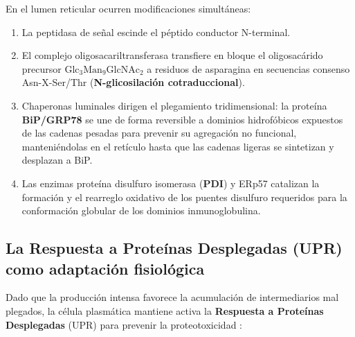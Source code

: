 En el lumen reticular ocurren modificaciones simultáneas:
\begin{enumerate}
	\item La peptidasa de señal escinde el péptido conductor N-terminal.
	\item El complejo oligosacariltransferasa transfiere en bloque el oligosacárido precursor $\text{Glc}_3\text{Man}_9\text{GlcNAc}_2$ a residuos de asparagina en secuencias consenso Asn-X-Ser/Thr (\textbf{N-glicosilación cotraduccional}).
	\item Chaperonas luminales dirigen el plegamiento tridimensional: la proteína \textbf{BiP/GRP78} se une de forma reversible a dominios hidrofóbicos expuestos de las cadenas pesadas para prevenir su agregación no funcional, manteniéndolas en el retículo hasta que las cadenas ligeras se sintetizan y desplazan a BiP.
	\item Las enzimas proteína disulfuro isomerasa (\textbf{PDI}) y ERp57 catalizan la formación y el rearreglo oxidativo de los puentes disulfuro requeridos para la conformación globular de los dominios inmunoglobulina.
\end{enumerate}

\subsection{La Respuesta a Proteínas Desplegadas (UPR) como adaptación fisiológica}
Dado que la producción intensa favorece la acumulación de intermediarios mal plegados, la célula plasmática mantiene activa la \textbf{Respuesta a Proteínas Desplegadas} (UPR) para prevenir la proteotoxicidad \parencite{walter2011unfolded,cenci2008progressive}:

